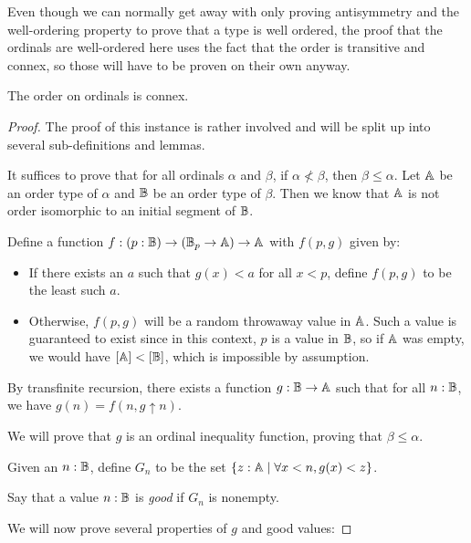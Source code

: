 \documentclass[../../math.tex]{subfiles}
\begin{document}
Even though we can normally get away with only proving antisymmetry and the
well-ordering property to prove that a type is well ordered, the proof that the
ordinals are well-ordered here uses the fact that the order is transitive and
connex, so those will have to be proven on their own anyway.

\begin{instance}
    The order on ordinals is connex.
\end{instance}

\begin{proof}
    The proof of this instance is rather involved and will be split up into
    several sub-definitions and lemmas.

    It suffices to prove that for all ordinals $\alpha$ and $\beta$, if $\alpha
    \nless \beta$, then $\beta \leq \alpha$.  Let $\mathbb{A}$ be an order type of
    $\alpha$ and $\mathbb{B}$ be an order type of $\beta$.  Then we know that $\mathbb{A}$ is
    not order isomorphic to an initial segment of $\mathbb{B}$.
    \begin{definition}
        Define a function $f : (p : \mathbb{B}) \to (\mathbb{B}_p \to \mathbb{A}) \to \mathbb{A}$ with $f(p,
        g)$ given by:
        \begin{itemize}
            \item If there exists an $a$ such that $g(x) < a$ for all $x < p$,
                define $f(p, g)$ to be the least such $a$.
            \item Otherwise, $f(p, g)$ will be a random throwaway value in $\mathbb{A}$.
                Such a value is guaranteed to exist since in this context, $p$ is a
                value in $\mathbb{B}$, so if $\mathbb{A}$ was empty, we would have $[\mathbb{A}] < [\mathbb{B}]$,
                which is impossible by assumption.
        \end{itemize}
        By transfinite recursion, there exists a function $g : \mathbb{B} \to \mathbb{A}$ such
        that for all $n : \mathbb{B}$, we have $g(n) = f(n, g \uparrow n)$.
    \end{definition}
    We will prove that $g$ is an ordinal inequality function, proving that
    $\beta \leq \alpha$.

    \begin{definition}
        Given an $n : \mathbb{B}$, define $G_n$ to be the set $\{z : \mathbb{A} \mid \forall x <
        n, g(x) < z\}$.
    \end{definition}

    \begin{definition}
        Say that a value $n : \mathbb{B}$ is \textit{good} if $G_n$ is nonempty.
    \end{definition}
    We will now prove several properties of $g$ and good values:


\end{proof}
\end{document}
